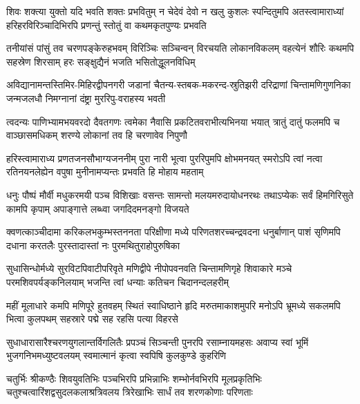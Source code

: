 

\fourlineindentedshloka
{शिवः शक्त्या युक्तो यदि भवति शक्तः प्रभवितुम्}
{न चेदेवं देवो न खलु कुशलः स्पन्दितुमपि}
{अतस्त्वामाराध्यां हरिहरविरिञ्चादिभिरपि}
{प्रणन्तुं स्तोतुं वा कथमकृतपुण्यः प्रभवति}%

\fourlineindentedshloka
{तनीयांसं पांसुं तव चरणपङ्केरुहभवम्}
{विरिञ्चिः सञ्चिन्वन् विरचयति लोकानविकलम्}
{वहत्येनं शौरिः कथमपि सहस्रेण शिरसाम्}
{हरः सङ्क्षुद्यैनं भजति भसितोद्धूलनविधिम्}%

\fourlineindentedshloka
{अविद्यानामन्तस्तिमिर-मिहिरद्वीपनगरी}
{जडानां चैतन्य-स्तबक-मकरन्द-स्रुतिझरी}
{दरिद्राणां चिन्तामणिगुणनिका जन्मजलधौ}
{निमग्नानां दंष्ट्रा मुररिपु-वराहस्य भवती}%

\fourlineindentedshloka
{त्वदन्यः पाणिभ्यामभयवरदो दैवतगणः}
{त्वमेका नैवासि प्रकटितवराभीत्यभिनया}
{भयात् त्रातुं दातुं फलमपि च वाञ्छासमधिकम्}
{शरण्ये लोकानां तव हि चरणावेव निपुणौ}%

\fourlineindentedshloka
{हरिस्त्वामाराध्य प्रणतजनसौभाग्यजननीम्}
{पुरा नारी भूत्वा पुररिपुमपि क्षोभमनयत्}
{स्मरोऽपि त्वां नत्वा रतिनयनलेह्येन वपुषा}
{मुनीनामप्यन्तः प्रभवति हि मोहाय महताम्}%

\fourlineindentedshloka
{धनुः पौष्पं मौर्वी मधुकरमयी पञ्च विशिखाः}
{वसन्तः सामन्तो मलयमरुदायोधनरथः}
{तथाऽप्येकः सर्वं हिमगिरिसुते कामपि कृपाम्}
{अपाङ्गात्ते लब्ध्वा जगदिदमनङ्गो विजयते}%

\fourlineindentedshloka
{क्वणत्काञ्चीदामा करिकलभकुम्भस्तननता}
{परिक्षीणा मध्ये परिणतशरच्चन्द्रवदना}
{धनुर्बाणान् पाशं सृणिमपि दधाना करतलैः}
{पुरस्तादास्तां नः पुरमथितुराहोपुरुषिका}%

\fourlineindentedshloka
{सुधासिन्धोर्मध्ये सुरविटपिवाटीपरिवृते}
{मणिद्वीपे नीपोपवनवति चिन्तामणिगृहे}
{शिवाकारे मञ्चे परमशिवपर्यङ्कनिलयाम्}
{भजन्ति त्वां धन्याः कतिचन चिदानन्दलहरीम्}%

\fourlineindentedshloka
{महीं मूलाधारे कमपि मणिपूरे हुतवहम्}
{स्थितं स्वाधिष्ठाने हृदि मरुतमाकाशमुपरि}
{मनोऽपि भ्रूमध्ये सकलमपि भित्वा कुलपथम्}
{सहस्रारे पद्मे सह रहसि पत्या विहरसे}%

\fourlineindentedshloka
{सुधाधारासारैश्चरणयुगलान्तर्विगलितैः}
{प्रपञ्चं सिञ्चन्ती पुनरपि रसाम्नायमहसः}
{अवाप्य स्वां भूमिं भुजगनिभमध्युष्टवलयम्}
{स्वमात्मानं कृत्वा स्वपिषि कुलकुण्डे कुहरिणि}%

\fourlineindentedshloka
{चतुर्भिः श्रीकण्ठैः शिवयुवतिभिः पञ्चभिरपि}
{प्रभिन्नाभिः शम्भोर्नवभिरपि मूलप्रकृतिभिः}
{चतुश्चत्वारिंशद्वसुदलकलाश्रत्रिवलय}
{त्रिरेखाभिः सार्धं तव शरणकोणाः परिणताः}%

